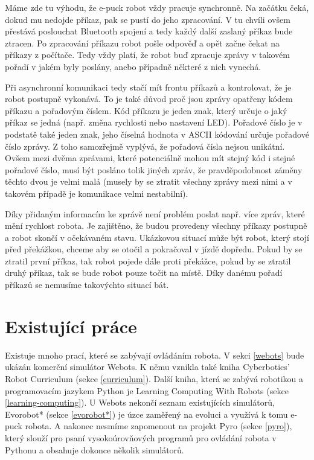 \documentclass[12pt,notitlepage]{report}
\begin{document}
    Máme zde tu výhodu, že e-puck robot vždy pracuje synchronně. Na začátku
    čeká, dokud mu nedojde příkaz, pak se pustí do jeho zpracování. V tu chvíli
    ovšem přestává poslouchat Bluetooth spojení a tedy každý další zaslaný
    příkaz bude ztracen. Po zpracování příkazu robot pošle odpověď a opět začne
    čekat na příkazy z počítače. Tedy vždy platí, že robot buď zpracuje zprávy
    v takovém pořadí v jakém byly poslány, anebo případně některé z nich
    vynechá.

    Při asynchronní komunikaci tedy stačí mít frontu příkazů a kontrolovat, že
    je robot postupně vykonává. To je také důvod proč jsou zprávy opatřeny
    kódem příkazu a pořadovým číslem. Kód příkazu je jeden znak, který určuje o
    jaký příkaz se jedná (např. změna rychlosti nebo nastavení LED). Pořadové
    číslo je v podstatě také jeden znak, jeho číselná hodnota v ASCII kódování
    určuje pořadové číslo zprávy. Z toho samozřejmě vyplývá, že pořadová čísla
    nejsou unikátní. Ovšem mezi dvěma zprávami, které potenciálně mohou mít
    stejný kód i stejné pořadové číslo, musí být posláno tolik jiných zpráv, že
    pravděpodobnost záměny těchto dvou je velmi malá (musely by se ztratit
    všechny zprávy mezi nimi a v takovém případě je komunikace velmi
    nestabilní).

    Díky přidaným informacím ke zprávě není problém poslat např. více zpráv,
    které mění rychlost robota. Je zajištěno, že budou provedeny všechny
    příkazy postupně a robot skončí v očekávaném stavu. Ukázkovou situací může
    být robot, který stojí před překážkou, chceme aby se otočil a pokračoval v
    jízdě dopředu. Pokud by se ztratil první příkaz, tak robot pojede dále
    proti překážce, pokud by se ztratil druhý příkaz, tak se bude robot pouze
    točit na místě. Díky danému pořadí příkazů se nemusíme takovýchto situací
    bát.

    \section{Existující práce}

        Existuje mnoho prací, které se zabývají ovládáním robota. V sekci
        \ref{webots} bude ukázán komerční simulátor Webots. K němu vznikla také
        kniha Cyberbotics' Robot Curriculum (sekce \ref{curriculum}). Další
        kniha, která se zabývá robotikou a programovacím jazykem Python je
        Learning Computing With Robots (sekce \ref{learning-computing}). U
        Webots nekončí seznam existujících simulátorů, Evorobot* (sekce
        \ref{evorobot*}) je úzce zaměřený na evoluci a využívá k tomu e-puck
        robota. A nakonec nesmíme zapomenout na projekt Pyro (sekce
        \ref{pyro}), který slouží pro psaní vysokoúrovňových programů pro
        ovládání robota v Pythonu a obsahuje dokonce několik simulátorů.
\end{document}
